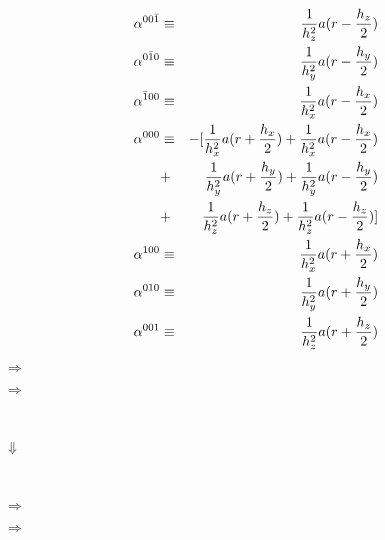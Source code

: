 \documentclass[11pt]{article}
\begin{document}
 \begin{eqnarray}
 \alpha^{00\bar{1}} & \equiv & \frac{1}{h_z^2} a(r-\frac{h_z}{2}) \\
 \alpha^{0\bar{1}0} & \equiv & \frac{1}{h_y^2} a(r-\frac{h_y}{2}) \\
 \alpha^{\bar{1}00} & \equiv & \frac{1}{h_x^2} a(r-\frac{h_x}{2}) \\
 \alpha^{000}  & \equiv & - [\frac{1}{h_x^2} a(r+\frac{h_x}{2})  + \frac{1}{h_x^2} a(r-\frac{h_x}{2}) \\
 & + & \frac{1}{h_y^2} a(r+\frac{h_y}{2})  + \frac{1}{h_y^2} a(r-\frac{h_y}{2}) \\
 & + & \frac{1}{h_z^2} a(r+\frac{h_z}{2})  + \frac{1}{h_z^2} a(r-\frac{h_z}{2})] \\
 \alpha^{100} & \equiv & \frac{1}{h_x^2} a(r+\frac{h_x}{2}) \\
 \alpha^{010} & \equiv & \frac{1}{h_y^2} a(r+\frac{h_y}{2}) \\
 \alpha^{001} & \equiv & \frac{1}{h_z^2} a(r+\frac{h_z}{2}) \\
 \end{eqnarray}

\begin{center}
\begin{minipage}{1.5in}
\end{minipage}
\end{center}
\begin{center}
\begin{minipage}{1.5in}
\end{minipage}
\end{center}
\begin{center}
\begin{minipage}{1.5in}
\end{minipage}
\end{center}



\begin{center}
\begin{minipage}{2in}
\end{minipage}$\Rightarrow$
\begin{minipage}{2in}
\end{minipage}$\Rightarrow$
\begin{minipage}{2in}
\end{minipage} \\
\begin{minipage}{4.5in}
\hfill $\Downarrow$
\end{minipage} \\
\begin{minipage}{2in}
\end{minipage}$\Rightarrow$
\begin{minipage}{2in}
\end{minipage}$\Rightarrow$
\begin{minipage}{2in}
\end{minipage}
\end{center}
\end{document}
